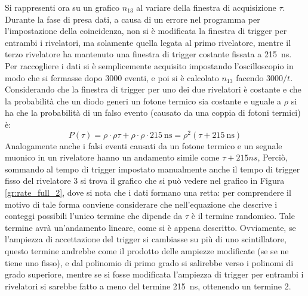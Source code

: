 Si rappresenti ora su un grafico $n_{13}$ al variare della finestra di acquisizione $\tau$. 
Durante la fase di presa dati, a causa di un errore nel programma per l'impostazione della coincidenza, non si è modificata la finestra di trigger per entrambi i rivelatori, ma solamente quella legata al primo rivelatore, mentre il terzo rivelatore ha mantenuto una finestra di trigger costante fissata a \SI{215}{\ns}. Per raccogliere i dati si è semplicemente acquisito impostando l'oscilloscopio in modo che si fermasse dopo 3000 eventi, e poi si è calcolato $n_{13}$ facendo $3000/t$.
Considerando che la finestra di trigger per uno dei due rivelatori è costante e che la probabilità che un diodo generi un fotone termico sia costante e uguale a $\rho$ si ha che la probabilità di un falso evento (causato da una coppia di fotoni termici) è:
\begin{equation}
  P(\tau)= \rho \cdot \rho \tau + \rho \cdot \rho \cdot \SI{215}{\nano\s} = \rho^2 (\tau + \SI{215}{\nano\s}) 
\end{equation}
Analogamente anche i falsi eventi causati da un fotone termico e un segnale muonico in un rivelatore hanno un andamento simile come $\tau +215 ns$,
Perciò, sommando al tempo di trigger impostato manualmente anche il tempo di trigger fisso del rivelatore $3$ si trova il grafico che si può vedere nel grafico in Figura \ref{gr:rate_full_2}, dove si nota che i dati formano una retta: per comprendere il motivo di tale forma conviene considerare che nell'equazione che descrive i conteggi possibili l'unico termine che dipende da $\tau$ è il termine randomico.
Tale termine avrà un'andamento lineare, come si \`e appena descritto. 
Ovviamente, se l'ampiezza di accettazione del trigger si cambiasse su più di uno scintillatore, questo termine andrebbe come il prodotto delle ampiezze modificate (se se ne tiene uno fisso), e dal polinomio di primo grado si salirebbe verso i polinomi di grado superiore, mentre se si fosse modificata l'ampiezza di trigger per entrambi i rivelatori si sarebbe fatto a meno del termine \SI{215}{\ns}, ottenendo un termine 2.
